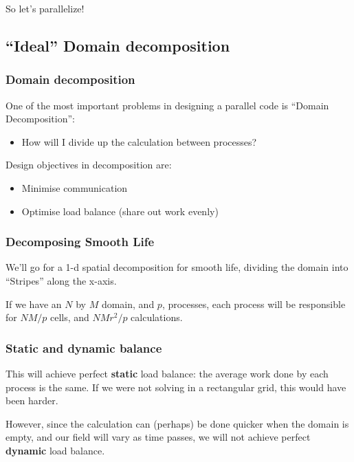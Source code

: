 So let's parallelize!

\subsection{``Ideal'' Domain
decomposition}\label{ideal-domain-decomposition}

\subsubsection{Domain decomposition}\label{domain-decomposition}

One of the most important problems in designing a parallel code is
``Domain Decomposition'':

\begin{itemize}
\itemsep1pt\parskip0pt
\item
  How will I divide up the calculation between processes?
\end{itemize}

Design objectives in decomposition are:

\begin{itemize}
\itemsep1pt\parskip0pt
\item
  Minimise communication
\item
  Optimise load balance (share out work evenly)
\end{itemize}

\subsubsection{Decomposing Smooth Life}\label{decomposing-smooth-life}

We'll go for a 1-d spatial decomposition for smooth life, dividing the
domain into ``Stripes'' along the x-axis.

If we have an $N$ by $M$ domain, and $p$, processes, each process will
be responsible for $NM/p$ cells, and $NMr^2/p$ calculations.

\subsubsection{Static and dynamic
balance}\label{static-and-dynamic-balance}

This will achieve perfect \textbf{static} load balance: the average work
done by each process is the same. If we were not solving in a
rectangular grid, this would have been harder.

However, since the calculation can (perhaps) be done quicker when the
domain is empty, and our field will vary as time passes, we will not
achieve perfect \textbf{dynamic} load balance.

